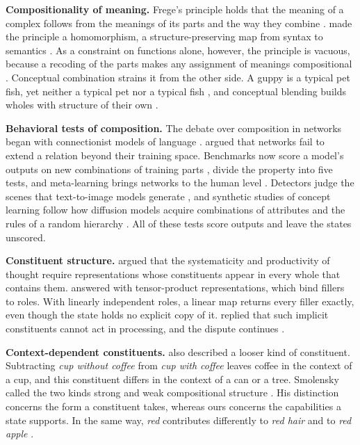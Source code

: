 \documentclass[10pt]{article}
\theoremstyle{plain}
\theoremstyle{remark}
\begin{document}
\textbf{Compositionality of meaning.} Frege's principle holds that the meaning of a complex follows from the meanings of its parts and the way they combine \citep{frege1923}. \citet{montague1970} made the principle a homomorphism, a structure-preserving map from syntax to semantics \citep[see][]{janssen1997}. As a constraint on functions alone, however, the principle is vacuous, because a recoding of the parts makes any assignment of meanings compositional \citep{zadrozny1994}. Conceptual combination strains it from the other side. A guppy is a typical pet fish, yet neither a typical pet nor a typical fish \citep{osherson1981}, and conceptual blending builds wholes with structure of their own \citep{fauconnier2002}.

\textbf{Behavioral tests of composition.} The debate over composition in networks began with connectionist models of language \citep{rumelhart1986,pinker1988,elman1990}. \citet{marcus1998} argued that networks fail to extend a relation beyond their training space. Benchmarks now score a model's outputs on new combinations of training parts \citep{lake2018,keysers2020}, \citet{hupkes2020} divide the property into five tests, and meta-learning brings networks to the human level \citep{lake2023}. Detectors judge the scenes that text-to-image models generate \citep{ramesh2021,huang2023t2i}, and synthetic studies of concept learning follow how diffusion models acquire combinations of attributes \citep{okawa2023} and the rules of a random hierarchy \citep{favero2025diffusion}. All of these tests score outputs and leave the states unscored.

\textbf{Constituent structure.} \citet{fodor1988} argued that the systematicity and productivity of thought require representations whose constituents appear in every whole that contains them. \citet{smolensky1990} answered with tensor-product representations, which bind fillers to roles. With linearly independent roles, a linear map returns every filler exactly, even though the state holds no explicit copy of it. \citet{fodor1990} replied that such implicit constituents cannot act in processing, and the dispute continues \citep{goodale2026}.

\textbf{Context-dependent constituents.} \citet{smolensky1988} also described a looser kind of constituent. Subtracting \emph{cup without coffee} from \emph{cup with coffee} leaves coffee in the context of a cup, and this constituent differs in the context of a can or a tree. Smolensky called the two kinds strong and weak compositional structure \citep{smolensky1987}. His distinction concerns the form a constituent takes, whereas ours concerns the capabilities a state supports. In the same way, \emph{red} contributes differently to \emph{red hair} and to \emph{red apple} \citep{kamp1995}.
\end{document}
